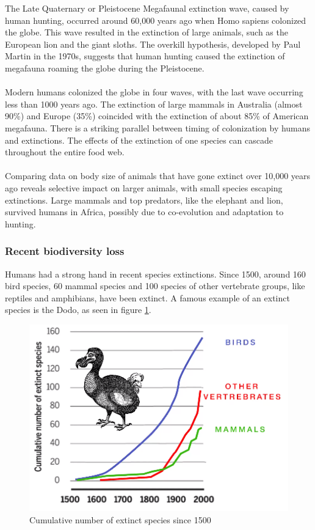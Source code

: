 \documentclass[../summary.tex]{subfiles}
\begin{document}
The Late Quaternary or Pleistocene Megafaunal extinction wave, caused by human hunting, occurred around 60,000 years ago when Homo sapiens colonized the globe. This wave resulted in the extinction of large animals, such as the European lion and the giant sloths. The overkill hypothesis, developed by Paul Martin in the 1970s, suggests that human hunting caused the extinction of megafauna roaming the globe during the Pleistocene. \\
\\
Modern humans colonized the globe in four waves, with the last wave occurring less than 1000 years ago. The extinction of large mammals in Australia (almost 90\%) and Europe (35\%) coincided with the extinction of about 85\% of American megafauna. There is a striking parallel between timing of colonization by humans and extinctions. The effects of the extinction of one species can cascade throughout the entire food web.\\
\\
Comparing data on body size of animals that have gone extinct over 10,000 years ago reveals selective impact on larger animals, with small species escaping extinctions. Large mammals and top predators, like the elephant and lion, survived humans in Africa, possibly due to co-evolution and adaptation to hunting.

\subsubsection{Recent biodiversity loss}
\label{sec:recent-diversity-loss}
Humans had a strong hand in recent species extinctions. Since 1500, around 160 bird species, 60 mammal species and 100 species of other vertebrate groups, like reptiles and amphibians,  have been extinct. A famous example of an extinct species is the Dodo, as seen in figure \ref{fig:recentbiodiversityloss}.

\begin{figure}[H]
	\centering
	\includegraphics[width=0.6\linewidth]{../images/recent_biodiversity_loss}
	\caption{Cumulative number of extinct species since 1500}
	\label{fig:recentbiodiversityloss}
\end{figure}
\ \\
\end{document}
